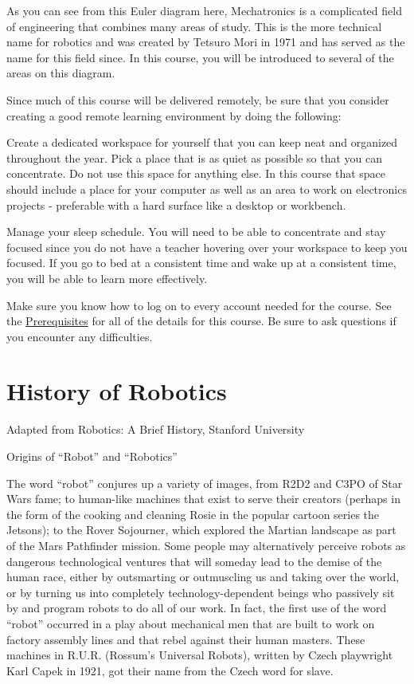\documentclass[
]{book}
\begin{document}
As you can see from this Euler diagram here, Mechatronics is a complicated field of engineering that combines many areas of study. This is the more technical name for robotics and was created by Tetsuro Mori in 1971 and has served as the name for this field since. In this course, you will be introduced to several of the areas on this diagram.

Since much of this course will be delivered remotely, be sure that you consider creating a good remote learning environment by doing the following:

Create a dedicated workspace for yourself that you can keep neat and organized throughout the year. Pick a place that is as quiet as possible so that you can concentrate. Do not use this space for anything else. In this course that space should include a place for your computer as well as an area to work on electronics projects - preferable with a hard surface like a desktop or workbench.

Manage your sleep schedule. You will need to be able to concentrate and stay focused since you do not have a teacher hovering over your workspace to keep you focused. If you go to bed at a consistent time and wake up at a consistent time, you will be able to learn more effectively.

Make sure you know how to log on to every account needed for the course. See the \protect\hyperlink{prerequisites}{Prerequisites} for all of the details for this course. Be sure to ask questions if you encounter any difficulties.

\hypertarget{history-of-robotics}{%
\section{History of Robotics}\label{history-of-robotics}}

Adapted from Robotics: A Brief History, Stanford University

Origins of ``Robot'' and ``Robotics''

The word ``robot'' conjures up a variety of images, from R2D2 and C3PO of Star Wars fame; to human-like machines that exist to serve their creators (perhaps in the form of the cooking and cleaning Rosie in the popular cartoon series the Jetsons); to the Rover Sojourner, which explored the Martian landscape as part of the Mars Pathfinder mission. Some people may alternatively perceive robots as dangerous technological ventures that will someday lead to the demise of the human race, either by outsmarting or outmuscling us and taking over the world, or by turning us into completely technology-dependent beings who passively sit by and program robots to do all of our work. In fact, the first use of the word ``robot'' occurred in a play about mechanical men that are built to work on factory assembly lines and that rebel against their human masters. These machines in R.U.R. (Rossum's Universal Robots), written by Czech playwright Karl Capek in 1921, got their name from the Czech word for slave.
\end{document}
